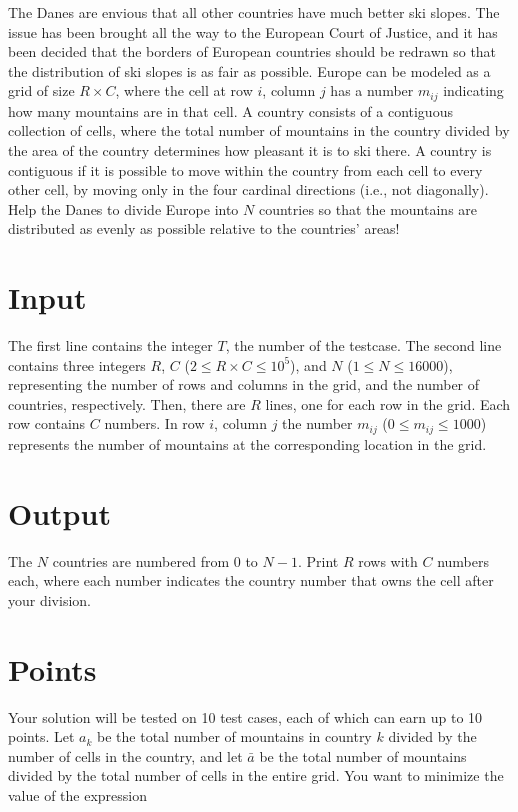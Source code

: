 
\noindent The Danes are envious that all other countries have much better ski slopes. 
The issue has been brought all the way to the European Court of Justice,
and it has been decided that the borders of European countries should be redrawn so that the distribution
of ski slopes is as fair as possible. Europe can be modeled as a grid of size $R \times C$,
where the cell at row $i$, column $j$ has a number $m_{ij}$ indicating 
how many mountains are in that cell.
A country consists of a contiguous collection of cells,
where the total number of mountains in the country divided by the area of the country
determines how pleasant it is to ski there.
A country is contiguous if it is possible to move within the country
from each cell to every other cell, by moving only in the four cardinal directions (i.e., not diagonally).
Help the Danes to divide Europe into $N$ countries so that 
the mountains are distributed as evenly as possible relative to the countries' areas!

\section*{Input}
The first line contains the integer $T$, the number of the testcase.
The second line contains three integers $R$, $C$ ($2 \le R \times C \le 10^5$), and $N$ ($1 \le N \le 16000$), 
representing the number of rows and columns in the grid,
and the number of countries, respectively.
Then, there are $R$ lines, one for each row in the grid. 
Each row contains $C$ numbers. In row $i$, column $j$ 
the number $m_{ij}$ ($0 \leq m_{ij} \leq 1000$) represents 
the number of mountains at the corresponding location in the grid.

\section*{Output}
The $N$ countries are numbered from $0$ to $N - 1$. Print $R$ rows with $C$ numbers each, where each number indicates
the country number that owns the cell after your division.

\section*{Points}
Your solution will be tested on 10 test cases,
each of which can earn up to 10 points.
Let $a_k$ be the total number of mountains in country $k$ divided by the number of cells in the country,
and let $\bar{a}$ be the total number of mountains divided by the total number of cells in the entire grid.
You want to minimize the value of the expression

